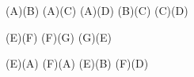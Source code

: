 	
	
	
	
	\Edge(A)(B)
	\Edge(A)(C)
	\Edge(A)(D)
	\Edge(B)(C)
	\Edge(C)(D)
	
	\Edge(E)(F)
	\Edge(F)(G)
	\Edge(G)(E)
	
	\Edge(E)(A)
	\Edge(F)(A)	
	\Edge(E)(B)
	\Edge(F)(D)
